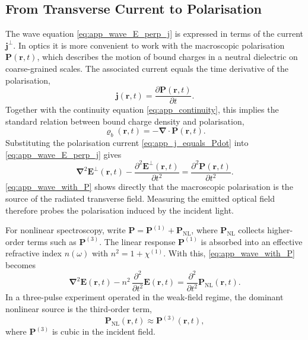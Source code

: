 \subsection{From Transverse Current to Polarisation}
\label{app:subsec:current_to_polarisation}
The wave equation \autoref{eq:app_wave_E_perp_j} is expressed in terms of the current $\boldsymbol{j}^{\perp}$. In optics it is more convenient to work with the macroscopic polarisation $\boldsymbol{P}(\boldsymbol{r},t)$, which describes the motion of bound charges in a neutral dielectric on coarse-grained scales. The associated current equals the time derivative of the polarisation,
\begin{equation}
	\boldsymbol{j}(\boldsymbol{r},t) = \frac{\partial \boldsymbol{P}(\boldsymbol{r},t)}{\partial t}.
	\label{eq:app_j_equals_Pdot}
\end{equation}
Together with the continuity equation \autoref{eq:app_continuity}, this implies the standard relation between bound charge density and polarisation,
\begin{equation*}
	\varrho_b(\boldsymbol{r},t) = -\boldsymbol{\nabla}\cdot\boldsymbol{P}(\boldsymbol{r},t).
\end{equation*}
Substituting the polarisation current \autoref{eq:app_j_equals_Pdot} into \autoref{eq:app_wave_E_perp_j} gives
\begin{equation}
	\boldsymbol{\nabla}^2\boldsymbol{E}^{\perp}(\boldsymbol{r},t)
	- \frac{\partial^2\boldsymbol{E}^{\perp}(\boldsymbol{r},t)}{\partial t^2}
	= \frac{\partial^2\boldsymbol{P}(\boldsymbol{r},t)}{\partial t^2}.
	\label{eq:app_wave_with_P}
\end{equation}
\autoref{eq:app_wave_with_P} shows directly that the macroscopic polarisation is the source of the radiated transverse field. Measuring the emitted optical field therefore probes the polarisation induced by the incident light.

\medskip

For nonlinear spectroscopy, write $\boldsymbol{P}=\boldsymbol{P}^{(1)}+\boldsymbol{P}_{\mathrm{NL}}$, where $\boldsymbol{P}_{\mathrm{NL}}$ collects higher-order terms such as $\boldsymbol{P}^{(3)}$. The linear response $\boldsymbol{P}^{(1)}$ is absorbed into an effective refractive index $n(\omega)$ with $n^2 = 1 + \chi^{(1)}$. With this, \autoref{eq:app_wave_with_P} becomes
\begin{equation}
	\boldsymbol{\nabla}^2 \boldsymbol{E}(\boldsymbol{r},t)
	- n^2\,\frac{\partial^2}{\partial t^2}\boldsymbol{E}(\boldsymbol{r},t)
	= \frac{\partial^2}{\partial t^2}\boldsymbol{P}_{\mathrm{NL}}(\boldsymbol{r},t).
	\label{eq:app_wave_eq_nonlinear}
\end{equation}
In a three-pulse experiment operated in the weak-field regime, the dominant nonlinear source is the third-order term,
\begin{equation*}
	\boldsymbol{P}_{\mathrm{NL}}(\boldsymbol{r},t) \approx \boldsymbol{P}^{(3)}(\boldsymbol{r},t),
\end{equation*}
where $\boldsymbol{P}^{(3)}$ is cubic in the incident field.

